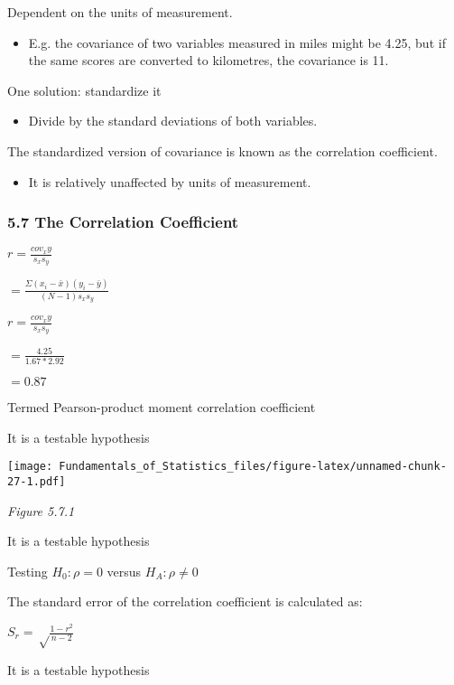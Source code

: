 \documentclass[]{article}
\providecommand{\tightlist}{%
  \setlength{\itemsep}{0pt}\setlength{\parskip}{0pt}}
\begin{document}
Dependent on the units of measurement.

\begin{itemize}
\tightlist
\item
  E.g. the covariance of two variables measured in miles might be 4.25,
  but if the same scores are converted to kilometres, the covariance is
  11.
\end{itemize}

One solution: standardize it

\begin{itemize}
\tightlist
\item
  Divide by the standard deviations of both variables.
\end{itemize}

The standardized version of covariance is known as the correlation
coefficient.

\begin{itemize}
\tightlist
\item
  It is relatively unaffected by units of measurement.
\end{itemize}

\hypertarget{the-correlation-coefficient}{%
\subsubsection{5.7 The Correlation
Coefficient}\label{the-correlation-coefficient}}

\(r=\frac{cov_xy}{s_xs_y}\)

\(=\frac{\Sigma(x_i - \bar{x})(y_i - \bar{y})}{(N-1)s_xs_y}\)

\(r=\frac{cov_xy}{s_xs_y}\)

\(=\frac{4.25}{1.67 * 2.92}\)

\(=0.87\)

Termed Pearson-product moment correlation coefficient

It is a testable hypothesis

\texttt{[image: Fundamentals\_of\_Statistics\_files/figure-latex/unnamed-chunk-27-1.pdf]}

\emph{Figure 5.7.1}

It is a testable hypothesis

Testing \(H_0: \rho=0\) versus \(H_A: \rho\ne0\)

The standard error of the correlation coefficient is calculated as:

\(S_r=\sqrt\frac{1-r^2}{n-2}\)

It is a testable hypothesis
\end{document}
